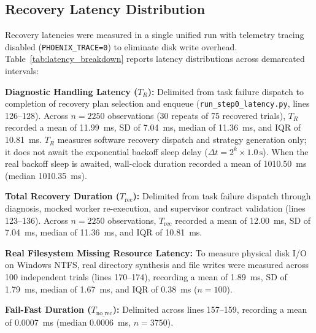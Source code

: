 \documentclass[conference]{IEEEtran}
\newcommand{\chg}[1]{{\color{blue}#1}}
\begin{document}
\subsection{Recovery Latency Distribution}
Recovery latencies were measured in a single unified run with telemetry tracing disabled (\texttt{PHOENIX\_TRACE=0}) to eliminate disk write overhead. \chg{Table~\ref{tab:latency_breakdown} reports latency distributions across demarcated intervals:}

\textbf{Diagnostic Handling Latency ($T_R$):} Delimited from task failure dispatch to completion of recovery plan selection and enqueue \chg{(\texttt{run\_step0\_latency.py}, lines 126--128). Across $n=2250$ observations (30 repeats of 75 recovered trials), $T_R$ recorded a mean of 11.99~ms, SD of 7.04~ms, median of 11.36~ms, and IQR of 10.81~ms. $T_R$ measures software recovery dispatch and strategy generation only; it does not await the exponential backoff sleep delay ($\Delta t = 2^k \times 1.0\,\text{s}$). When the real backoff sleep is awaited, wall-clock duration recorded a mean of 1010.50~ms (median 1010.35~ms).}

\textbf{Total Recovery Duration ($T_{\text{rec}}$):} Delimited from task failure dispatch through diagnosis, mocked worker re-execution, and supervisor contract validation \chg{(lines 123--136). Across $n=2250$ observations, $T_{\text{rec}}$ recorded a mean of 12.00~ms, SD of 7.04~ms, median of 11.36~ms, and IQR of 10.81~ms.}

\textbf{Real Filesystem Missing Resource Latency:} To measure physical disk I/O on Windows NTFS, real directory synthesis and file writes were measured across 100 independent trials \chg{(lines 170--174), recording a mean of 1.89~ms, SD of 1.79~ms, median of 1.67~ms, and IQR of 0.38~ms ($n=100$).}

\textbf{Fail-Fast Duration ($T_{\text{no\_rec}}$):} \chg{Delimited across lines 157--159, recording a mean of 0.0007~ms (median 0.0006~ms, $n=3750$).}
\end{document}
